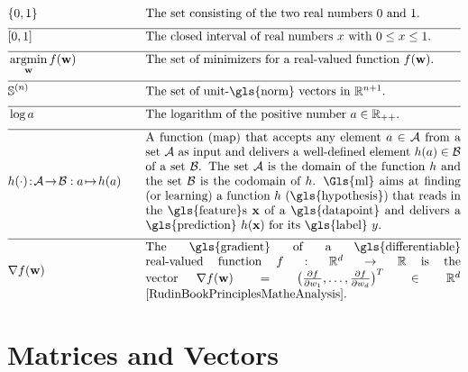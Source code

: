 \newpage
\begin{align}
		&\{0,1\}& \quad & \mbox{The set consisting of the two real numbers $0$ and $1$.} \nonumber \\[2mm] \hline \nonumber\\[-5mm]
	&[0,1] &\quad &\mbox{The closed interval of real numbers $x$ with $0 \leq x \leq 1$. }\nonumber \\[2mm] \hline \nonumber\\[-5mm]
    &\argmin_{\weights} f(\weights) &\quad &\mbox{The set of minimizers for a real-valued function $f(\weights)$.  } \nonumber \\[2mm] \hline \nonumber\\[-5mm]
    &\sphere{\nrnodes} &\quad &\mbox{The set of unit-\gls{norm} vectors in $\mathbb{R}^{\nrnodes+1}$.  }\nonumber \\[2mm] \hline \nonumber\\[-5mm]
	 &\log a &\quad &\mbox{The logarithm of the positive number $a \in \mathbb{R}_{++}$.  } \nonumber \\[2mm] \hline \nonumber\\[-5mm]
	 &\hypothesis(\cdot)\!:\!\mathcal{A}\!\rightarrow\!\mathcal{B} :  a \!\mapsto\!h(a) &\quad &\parbox{.75\textwidth}{
	 	A function (map) that accepts any element $a \in \mathcal{A}$ from a set $\mathcal{A}$ 
	 	as input and delivers a well-defined element $h(a) \in \mathcal{B}$ of a set $\mathcal{B}$. 
	 	The set $\mathcal{A}$ is the domain of the function $h$ and the set $\mathcal{B}$ is the 
	 	codomain of $\hypothesis$. \Gls{ml} aims at finding (or learning) a function $\hypothesis$ (\gls{hypothesis}) 
	 	that reads in the \gls{feature}s $\featurevec$ of a \gls{datapoint} and delivers a \gls{prediction} $\hypothesis(\featurevec)$
	 	for its \gls{label} $\truelabel$.} \nonumber \\[2mm] \hline \nonumber\\[-5mm]
	 	&\nabla f(\weights) & \quad & \parbox{.75\textwidth}{The \gls{gradient} of a \gls{differentiable} real-valued function 
	 	$f: \mathbb{R}^{\featuredim}\rightarrow \mathbb{R}$ is the vector 
	 	$\nabla f(\weights) = \big( \frac{\partial f}{\partial \weight_{1}},\ldots,\frac{\partial f}{\partial \weight_{\featuredim}}  \big)^{T} \in \mathbb{R}^{\featuredim}$ \cite[Ch. 9]{RudinBookPrinciplesMatheAnalysis}.}   \nonumber
\end{align} 
\section*{Matrices and Vectors} 

